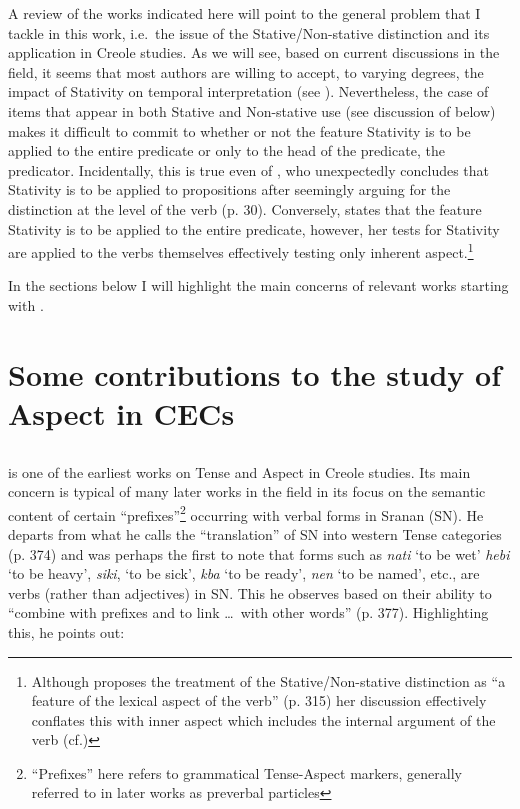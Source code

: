 A review of the works indicated here will point to the general problem
that I tackle in this work, i.e.\ the issue of the Stative\slash Non-stative
distinction and its application in Creole studies.  As we will see,
based on current discussions in the field, it seems that most authors
are willing to accept, to varying degrees, the impact of Stativity on
temporal interpretation (see
\citealt{Gooden2008,Sidnell2002,Winford1993,Winford2000}).  Nevertheless,
the case of items that appear in both Stative and Non-stative use (see
discussion of \citealt{Jaganauth1987} below) makes it difficult to commit to
whether or not the feature Stativity is to be applied to the entire
predicate or only to the head of the predicate, the predicator.
Incidentally, this is true even of \citet{Bickerton1975}, who
unexpectedly concludes that Stativity is to be applied to propositions
after seemingly arguing for the distinction at the level of the verb
(p. 30).  Conversely, \citet{Gooden2008} states that the feature
Stativity is to be applied to the entire predicate, however, her tests for
Stativity are applied to the verbs themselves effectively testing only
inherent aspect.\footnote{Although \citet{Gooden2008} proposes the
  treatment of the Stative\slash Non-stative distinction as “a feature of
  the lexical aspect of the verb” (p. 315) her discussion effectively
  conflates this with inner aspect which includes the internal
  argument of the verb (cf.\citealt{Verkuyl1999})}

In the sections below I will highlight the main concerns of relevant
works starting with \citet{Voorhoeve1957}.

\section{Some contributions to the study of Aspect in
  CECs}\label{sec:2.1}
\subsection{\citet{Voorhoeve1957}}\label{sec:2.1.1}

\citet{Voorhoeve1957} is one of the earliest works on Tense and Aspect
in Creole studies.  Its main concern is typical of many later works in
the field in its focus on the semantic content of certain
“prefixes”\footnote{``Prefixes'' here refers to grammatical Tense-Aspect
  markers, generally referred to in later works as preverbal
  particles} occurring with verbal forms in Sranan (SN).  He departs
from what he calls the “translation” of SN into western Tense
categories (p. 374) and was perhaps the first to note that forms such
as \textit{nati} `to be wet' \textit{hebi} `to be heavy',
\textit{siki}, `to be sick', \textit{kba} `to be ready', \textit{nen}
`to be named', etc., are verbs (rather than adjectives) in SN.  This he
observes based on their ability to “combine with prefixes and to link
\dots\ with other words” (p. 377).  Highlighting this, he points out:

